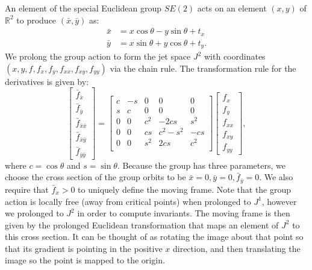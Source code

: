 \documentclass[review,onefignum,onetabnum]{siamonline190516}
\begin{document}
An element of the special Euclidean group $SE(2)$ acts on an element $(x, y)$ of $\mathbb{R}^2$ to produce $(\bar{x}, \bar{y})$ as:
\begin{equation*}
  \begin{aligned}
    \bar{x} &= x\cos\theta  - y\sin\theta + t_x \\
    \bar{y} &= x\sin\theta  + y\cos\theta + t_y.
  \end{aligned}
\end{equation*}
We prolong the group action to form the jet space $J^2$ with coordinates $(x,
y, f, f_x, f_y, f_{xx}, f_{xy}, f_{yy})$ via the chain rule. The
transformation rule for the derivatives is given by:
\begin{equation}
  \begin{bmatrix}
  \bar f_{\bar x} \\ \bar f_{\bar y} \\ \bar f_{\bar{x}\bar{x}} \\ \bar f_{\bar{x}\bar{y}} \\ \bar f_{\bar{y}\bar{y}}
  \end{bmatrix} = 
  \begin{bmatrix}
 c & -s & 0 & 0 & 0 \\
 s & c & 0 & 0 & 0 \\
0 & 0 & c^2 & -2cs & s^2 \\
0 & 0 & cs & c^2 - s^2 & -cs \\
0 & 0 & s^2 & 2cs & c^2 \\
  \end{bmatrix}
  \begin{bmatrix}
f_x \\ f_y \\ f_{xx} \\ f_{xy} \\ f_{yy} 
  \end{bmatrix},
\label{eqn:SE2}
 \end{equation}
where $c = \cos \theta$ and $s = \sin \theta$. Because the group has three
parameters, we choose the cross section of the group orbits to be $\bar{x}
= 0, \bar{y} = 0, \bar{f}_{\bar{y}} = 0$. We also require that $\bar{f}_{x}
> 0$ to uniquely define the moving frame. Note that the group action is
locally free (away from critical points) when prolonged to $J^1$, however
we prolonged to $J^2$ in order to compute invariants. The moving
frame is then given by the prolonged Euclidean transformation that maps an
element of  $J^2$ to this cross section. It can be thought of as rotating
the image about that point so that its gradient is pointing in the positive
$x$ direction, and then translating the image so the point is mapped to the
origin. 
\end{document}
